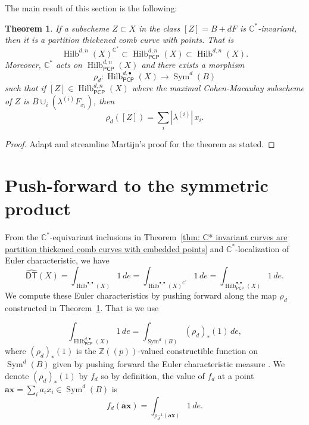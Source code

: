 \documentclass[12pt]{amsart}
\newtheorem{theorem}{Theorem}%
\theoremstyle{definition}
\newcommand{\CC} {\mathbb{C}}          %
\newcommand{\ZZ} {\mathbb{Z}}		%
\newcommand{\Sym}{\operatorname{Sym}}
\newcommand{\Hilb}{\operatorname{Hilb}}
\newcommand{\DT}{\mathsf{DT}}
\newcommand{\boldx}{\boldsymbol{x}}
\newcommand{\bolda}{\boldsymbol{a}}
\newcommand{\DThat}{\widehat{\DT}}
\newcommand{\PCP}{\mathsf{PCP}}
\begin{document}
The main result of this section is the following:
\begin{theorem}\label{thm: C* invariant curves are partition thickened
comb curves with embedded points} If a subscheme $Z\subset X$ in the
class $[Z]=B+dF$ is $\CC^{*}$-invariant, then it is a partition
thickened comb curve with points. That is
\[
\Hilb^{d,n}(X)^{\CC^{*}}\subset \Hilb^{d,n}_{\PCP }(X)\subset \Hilb^{d,n}(X).
\]
Moreover, $\CC^{*}$ acts
on $\Hilb^{d,n}_{\PCP}(X)$ and there
exists a morphism
\begin{equation}\label{eqn: rho : HilbPCP-->Sym(B)}
\rho_{d}: \Hilb^{d,\bullet}_{\PCP }(X) \to  \Sym^{d}(B)
\end{equation}
such that if $[Z]\in \Hilb_{\PCP}^{d,n}(X)$ where the maximal
Cohen-Macaulay subscheme of $Z$ is $B\cup_{i}\left(\lambda^{(i)}F_{x_{i}}
\right)$, then
\[
\rho_{d}([Z]) = \sum_{i} |\lambda^{(i)}|\,x_{i}. 
\]
\end{theorem}

\begin{proof}
Adapt and streamline Martijn's proof for the theorem as stated.
\end{proof}



\section{Push-forward to the symmetric product} \label{sec: pushforward to sym prod}

From the $\CC^{*}$-equivariant inclusions in Theorem~\ref{thm: C*
invariant curves are partition thickened comb curves with embedded
points} and $\CC^{*}$-localization of Euler characteristic, we have
\[
\DThat (X) = \int_{\Hilb^{\bullet ,\bullet}(X)} 1 \, de  =
\int_{\Hilb^{\bullet ,\bullet}(X)^{\CC^{*}}} 1 \, de  = \int_{\Hilb^{\bullet
,\bullet}_{\PCP }(X)} 1 \, de  .
\]
We compute these Euler characteristics by pushing forward along the
map $\rho_{d}$ constructed in Theorem~\ref{thm: C* invariant curves are partition thickened
comb curves with embedded points}. That is we use

$$
\int_{\Hilb^{d,\bullet}_{\PCP }(X)} 1 \, de = \int_{\Sym^d(B)} (\rho_{d})_{*}(1) \, de,
$$
where $(\rho_{d})_{*}(1)$ is the $\ZZ (\!(p)\!)$-valued constructible
function on $\Sym^d(B)$ given by pushing forward the Euler
characteristic measure \cite{MacPherson-Annals74}. We denote
$(\rho_{d})_{*}(1)$ by $f_{d}$ so by definition, the value of $f_{d} $
at a point $\bolda \boldx =\sum_{i}a_{i}x_{i} \in \Sym^d(B)$ is
$$
f_d(\bolda \boldx ) = \int_{\rho_{d}^{-1}(\bolda \boldx )} 1 \, de.
$$
\end{document}
